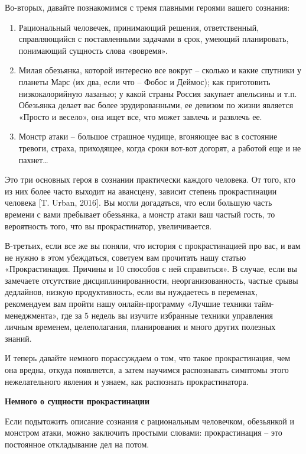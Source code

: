 Во-вторых, давайте познакомимся с тремя главными героями вашего сознания:

\begin{enumerate}
    \item Рациональный человечек, принимающий решения, ответственный, справляющийся с поставленными задачами в срок, умеющий планировать, понимающий сущность слова «вовремя».
    \item Милая обезьянка, которой интересно все вокруг – сколько и какие спутники у планеты Марс (их два, если что – Фобос и Деймос); как приготовить низкокалорийную лазанью; у какой страны Россия закупает апельсины и т.п. Обезьянка делает вас более эрудированными, ее девизом по жизни является «Просто и весело», она ищет все, что может завлечь и развлечь ее.
    \item Монстр атаки – большое страшное чудище, вгоняющее вас в состояние тревоги, страха, приходящее, когда сроки вот-вот догорят, а работой еще и не пахнет…
\end{enumerate}

Это три основных героя в сознании практически каждого человека. От того, кто из них более часто выходит на авансцену, зависит степень прокрастинации человека [T. Urban, 2016]. Вы могли догадаться, что если большую часть времени с вами пребывает обезьянка, а монстр атаки ваш частый гость, то вероятность того, что вы прокрастинатор, увеличивается.

В-третьих, если все же вы поняли, что история с прокрастинацией про вас, и вам не нужно в этом убеждаться, советуем вам прочитать нашу статью «Прокрастинация. Причины и 10 способов с ней справиться». В случае, если вы замечаете отсутствие дисциплинированности, неорганизованность, частые срывы дедлайнов, низкую продуктивность, если вы нуждаетесь в переменах, рекомендуем вам пройти нашу онлайн-программу «Лучшие техники тайм-менеджмента», где за 5 недель вы изучите избранные техники управления личным временем, целеполагания, планирования и много других полезных знаний.

И теперь давайте немного порассуждаем о том, что такое прокрастинация, чем она вредна, откуда появляется, а затем научимся распознавать симптомы этого нежелательного явления и узнаем, как распознать прокрастинатора.

\textbf{Немного о сущности прокрастинации}

Если подытожить описание сознания с рациональным человечком, обезьянкой и монстром атаки, можно заключить простыми словами: прокрастинация – это постоянное откладывание дел на потом.

